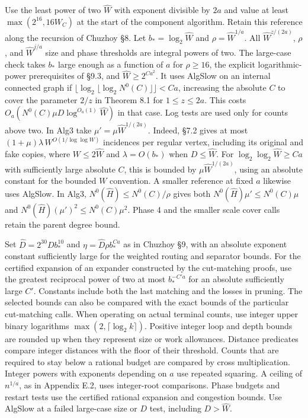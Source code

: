 \documentclass[11pt]{article}
\begin{document}
Use the least power of two \(\widehat W\) with exponent divisible by \(2a\) and value at least \(\max(2^{16},16W_C)\) at the start of the component algorithm. Retain this reference along the recursion of Chuzhoy §8. Let \(b_*=\log_2\widehat W\) and \(\rho=\widehat W^{1/a}\). All \(\widehat W^{z/(2a)}\), \(\rho\), and \(\widehat W^{j/a}\) size and phase thresholds are integral powers of two. The large-case check takes \(b_*\) large enough as a function of \(a\) for \(\rho\ge16\), the explicit logarithmic-power prerequisites of §9.3, and \(\widehat W\ge2^{C a^2}\). It uses AlgSlow on an internal connected graph if \(\lfloor\log_2\lfloor\log_2 N^0(C)\rfloor\rfloor<C a\), increasing the absolute \(C\) to cover the parameter \(2/z\) in Theorem 8.1 for \(1\le z\le2a\). This costs \(O_a(N^0(C)\mu D\log^{O_a(1)}\widehat W)\) in that case. Log tests are used only for counts above two. In Alg3 take \(\mu'=\mu\widehat W^{1/(2a)}\). Indeed, §7.2 gives at most \((1+\mu)\lambda\,W^{O(1/\log\log W)}\) incidences per regular vertex, including its original and fake copies, where \(W\le2\widehat W\) and \(\lambda=O(b_*)\) when \(D\le\widehat W\). For \(\log_2\log_2\widehat W\ge Ca\) with sufficiently large absolute \(C\), this is bounded by \(\mu\widehat W^{1/(2a)}\), using an absolute constant for the bounded \(W\) convention. A smaller reference at fixed \(a\) likewise uses AlgSlow. In Alg3, \(N^0(\widehat H)\le N^0(C)/\rho\) gives both \(N^0(\widehat H)\mu'\le N^0(C)\mu\) and \(N^0(\widehat H)(\mu')^2\le N^0(C)\mu^2\). Phase 4 and the smaller scale cover calls retain the parent degree bound.

Set \(\widehat D=2^{30}D b_*^{10}\) and \(\eta=\widehat D\rho b_*^{C a}\) as in Chuzhoy §9, with an absolute exponent constant sufficiently large for the weighted routing and separator bounds. For the certified expansion of an expander constructed by the cut-matching proofs, use the greatest reciprocal power of two at most \(b_*^{-C'a}\) for an absolute sufficiently large \(C'\). Constants include both the last matching and the losses in pruning. The selected bounds can also be compared with the exact bounds of the particular cut-matching calls. When operating on actual terminal counts, use integer upper binary logarithms \(\max(2,\lceil\log_2 k\rceil)\). Positive integer loop and depth bounds are rounded up when they represent size or work allowances. Distance predicates compare integer distances with the floor of their threshold. Counts that are required to stay below a rational budget are compared by cross multiplication. Integer powers with exponents depending on \(a\) use repeated squaring. A ceiling of \(n^{1/a}\), as in Appendix E.2, uses integer-root comparisons. Phase budgets and restart tests use the certified rational expansion and congestion bounds. Use AlgSlow at a failed large-case size or \(D\) test, including \(D>\widehat W\).
\end{document}
